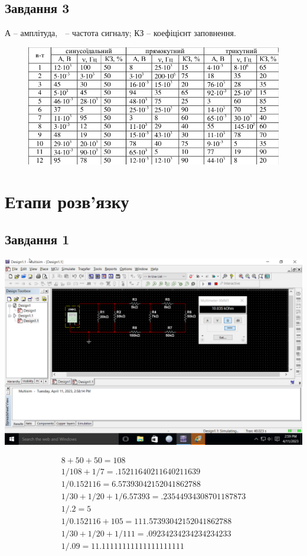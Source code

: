 \documentclass[a4paper, 12pt, oneside]{extarticle}
\begin{document}
\subsection*{Завдання 3}

А – амплітуда,  – частота сигналу; КЗ – коефіцієнт
заповнення.

\begin{figure}[h]
	\includegraphics[width=.8\textwidth]{images/task3.png}
\end{figure}

\section*{Етапи розв'язку}

\subsection*{Завдання 1}
	\includegraphics[width=\textwidth]{1.1.res}

\begin{align}
8+50+50 = 108 \\
1/108 + 1/7 = .15211640211640211639 \\
1/0.152116 = 6.57393042152041862788 \\
1/30+1/20+1/6.57393 = .23544934308701187873 \\
1/.2 = 5\\
1/0.152116+105 = 111.57393042152041862788 \\
1/30+1/20+1/111 = .09234234234234234233 \\
1/.09 = 11.11111111111111111111
\end{align}
\end{document}
